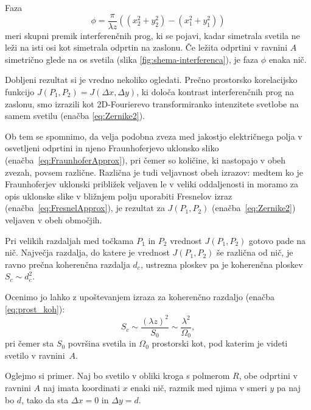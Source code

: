 Faza 
\begin{equation}
\phi=\frac{\pi}{\lambda z}\left((x_{2}^{2}+y_{2}^{2})-(x_{1}^{2}+y_{1}^{2})\right)
\end{equation}
meri skupni premik interferenčnih prog, ki se pojavi, kadar simetrala svetila
ne leži na isti osi kot simetrala odprtin na zaslonu. Če ležita odprtini v ravnini $A$ 
 simetrično glede na os svetila (slika \ref{fig:shema-interferenca}), je faza $\phi$ enaka nič.

Dobljeni rezultat si je vredno nekoliko ogledati. Prečno prostorsko
korelacijsko funkcijo $J(P_{1},P_{2}) = J(\Delta x,\Delta y)$, ki določa kontrast interferenčnih
prog na zaslonu, smo izrazili kot 2D-Fourierevo transformiranko intenzitete svetlobe
na samem svetilu (enačba \ref{eq:Zernike2}). 

\begin{remark}
Ob tem se spomnimo,
da velja podobna zveza med jakostjo električnega polja v osvetljeni odprtini 
in njeno Fraunhoferjevo uklonsko sliko (enačba~\ref{eq:FraunhoferApprox}), 
pri čemer so količine, ki nastopajo v obeh zvezah,
povsem različne. Različna je tudi veljavnost obeh izrazov: medtem ko je Fraunhoferjev
uklonski približek veljaven le v veliki oddaljenosti in moramo za opis uklonske slike v bližnjem polju
uporabiti Fresnelov izraz (enačba~\ref{eq:FresnelApprox}), 
je rezultat za $J(P_{1},P_{2})$ (enačba~\ref{eq:Zernike2}) veljaven v obeh območjih.
\end{remark}

Pri velikih razdaljah med točkama $P_{1}$ in $P_{2}$ vrednost $J(P_{1},P_{2})$ 
gotovo pade na nič. Največja razdalja, do katere je vrednost $J(P_{1},P_{2})$ še različna od nič, je ravno
prečna koherenčna razdalja $d_{c}$, ustrezna ploskev pa je koherenčna
ploskev $S_{c} \sim d_c^2$. 

Ocenimo jo lahko z upoštevanjem izraza 
za koherenčno razdaljo (enačba \ref{eq:prost_koh}):
\begin{equation}
S_{c}\sim\frac{(\lambda z)^{2}}{S_{0}}\sim\frac{\lambda^{2}}{\Omega_{0}},
\label{eq:koherencna-ploskev}
\end{equation}
pri čemer sta $S_{0}$ površina svetila in $\Omega_{0}$ prostorski kot,
pod katerim je videti svetilo v ravnini~$A$. 

Oglejmo si primer. Naj bo svetilo v obliki kroga 
s polmerom $R$, obe odprtini v ravnini $A$ naj imata koordinati $x$ enaki nič, razmik
med njima v smeri $y$ pa naj bo $d$, tako da sta $\Delta x = 0$ in $\Delta y = d$. 

